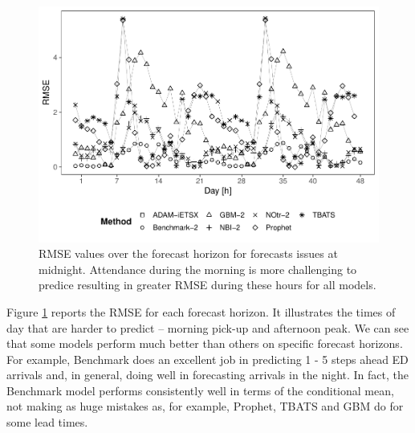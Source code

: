 \documentclass[]{elsarticle} %
\begin{document}
\begin{figure}[H]

{\centering \includegraphics[width=0.7\linewidth]{paper_files/figure-latex/lead-time-rmse-1} 

}

\caption{RMSE values over the forecast horizon for forecasts issues at midnight. Attendance during the morning is more challenging to predice resulting in greater RMSE during these hours for all models.}\label{fig:lead-time-rmse}
\end{figure}

Figure \ref{fig:lead-time-rmse} reports the RMSE for each forecast
horizon. It illustrates the times of day that are harder to predict --
morning pick-up and afternoon peak. We can see that some models perform
much better than others on specific forecast horizons. For example,
Benchmark does an excellent job in predicting 1 - 5 steps ahead ED
arrivals and, in general, doing well in forecasting arrivals in the
night. In fact, the Benchmark model performs consistently well in terms
of the conditional mean, not making as huge mistakes as, for example,
Prophet, TBATS and GBM do for some lead times.
\end{document}
